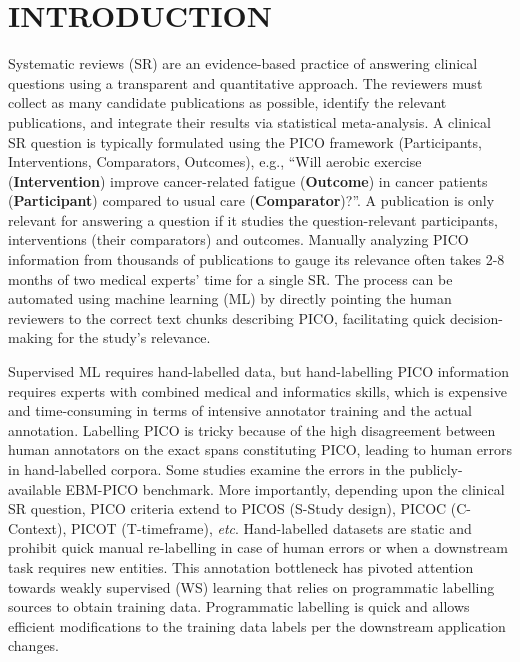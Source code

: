 \documentclass[10.7pt,]{article}
\begin{document}
\section{\textbf{INTRODUCTION}}\label{introduction}
%
Systematic reviews (SR) are an evidence-based practice of answering clinical questions using a transparent and quantitative approach.
The reviewers must collect as many candidate publications as possible, identify the relevant publications, and integrate their results via statistical meta-analysis.
A clinical SR question is typically formulated using the PICO framework (Participants, Interventions, Comparators, Outcomes), e.g., ``Will aerobic exercise (\textbf{Intervention}) improve cancer-related fatigue (\textbf{Outcome}) in cancer patients (\textbf{Participant}) compared to usual care (\textbf{Comparator})?''.
A publication is only relevant for answering a question if it studies the question-relevant participants, interventions (their comparators) and outcomes.\cite{uman2011systematic} 
Manually analyzing PICO information from thousands of publications to gauge its relevance often takes 2-8 months of two medical experts' time for a single SR.\cite{borah2017analysis}
The process can be automated using machine learning (ML) by directly pointing the human reviewers to the correct text chunks describing PICO, facilitating quick decision-making for the study's relevance.



Supervised ML requires hand-labelled data, but hand-labelling PICO information requires experts with combined medical and informatics skills, which is expensive and time-consuming in terms of intensive annotator training and the actual annotation.
Labelling PICO is tricky because of the high disagreement between human annotators on the exact spans constituting PICO, leading to human errors in hand-labelled corpora.\cite{brockmeier2019improving}
Some studies examine the errors in the publicly-available EBM-PICO benchmark.\cite{nye2018corpus,abaho2019correcting,lee2019study}
More importantly, depending upon the clinical SR question, PICO criteria extend to PICOS (S-Study design), PICOC (C-Context), PICOT (T-timeframe), \textit{etc}.\cite{riva2012your,methley2014pico,uman2011systematic}
Hand-labelled datasets are static and prohibit quick manual re-labelling in case of human errors or when a downstream task requires new entities.
This annotation bottleneck has pivoted attention towards weakly supervised (WS) learning that relies on programmatic labelling sources to obtain training data.
Programmatic labelling is quick and allows efficient modifications to the training data labels per the downstream application changes.
\end{document}

